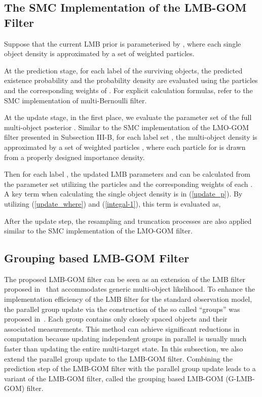 \documentclass[journal]{IEEEtran}
\begin{document}
{\subsection{The SMC Implementation of the LMB-GOM Filter}



Suppose that the current  LMB prior is parameterised by  , where each single object density 
  is approximated by a set of weighted particles. 

At the prediction stage, for each label  of the surviving objects, the predicted existence probability  and the probability density   are evaluated using the particles and the corresponding weights of . For explicit calculation formulas, refer to the SMC implementation of multi-Bernoulli filter\cite{refr:MeMber_filter1}.

At the update stage, in the first place, we evaluate the parameter set  of the full multi-object posterior .  Similar to the SMC implementation of the LMO-GOM filter presented in Subsection III-B, for each label set , the multi-object density   is approximated  by a set of weighted particles  ,
where each particle  for  is drawn from a   properly designed  importance density.

Then for each label , the updated LMB parameters  and  can be calculated from the parameter set   utilizing the particles and the corresponding weights of  each  . A key term when calculating the single object density  is    in (\ref{update_p}).  By utilizing (\ref{update_where}) and (\ref{integal-1}), this term  is evaluated  as,

After the update step, the resampling and truncation processes are also applied similar to the SMC implementation of the LMO-GOM filter.


\subsection{Grouping based LMB-GOM Filter}
The proposed LMB-GOM filter can be seen as  an extension of the LMB filter proposed in~\cite{refr:label_5} that accommodates generic multi-object likelihood. To enhance the implementation efficiency of the LMB filter for the  standard observation model, the parallel group update via the construction of the so called ``groups'' was proposed in~\cite{refr:label_5}. Each group contains only closely spaced objects and their associated measurements. This method can achieve significant reductions in computation because updating independent groups in parallel is usually much faster than updating the entire multi-target state. In this subsection, we also extend the parallel group update to the LMB-GOM filter.
Combining the prediction step of the LMB-GOM filter with the parallel group update leads to a variant of the LMB-GOM filter,  called the grouping based LMB-GOM (G-LMB-GOM) filter.


}
\end{document}
